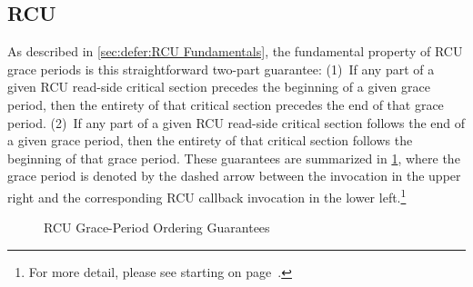 



\subsection{RCU}
\label{sec:memorder:RCU}

As described in
\cref{sec:defer:RCU Fundamentals},
the fundamental property of RCU grace periods is this straightforward
two-part guarantee:
(1)~If any part of a given RCU read-side critical section precedes
the beginning of a given grace period, then the entirety of that
critical section precedes the end of that grace period.
(2)~If any part of a given RCU read-side critical section follows
the end of a given grace period, then the entirety of that
critical section follows the beginning of that grace period.
These guarantees are summarized in
\cref{fig:memorder:RCU Grace-Period Ordering Guarantees},
where the grace period is denoted by the dashed arrow between the
 invocation in the upper right and the corresponding
RCU callback invocation in the lower left.\footnote{
	For more detail, please see
	starting on
	page~\pageref{fig:defer:RCU Reader and Later Grace Period}.}

\begin{figure}
\centering
{}
\caption{RCU Grace-Period Ordering Guarantees}
\label{fig:memorder:RCU Grace-Period Ordering Guarantees}
\end{figure}

